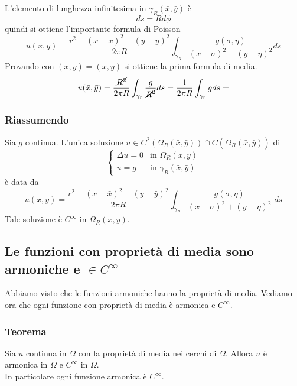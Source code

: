 L'elemento di lunghezza infinitesima in $\gamma_R (\bar{x}, \bar{y})$ \`e
\[
	ds= Rd\phi
\]
quindi si ottiene l'importante formula di Poisson
\[
	u(x,y)= \frac{r^2 - (x - \bar{x})^2 - (y -\bar{y})^2}{2 \pi R}
	\int_{\gamma_R} \frac{g(\sigma, \eta)}{(x - \sigma)^2+(y - \eta)^2} ds
\]
Provando con $(x,y)=(\bar{x},\bar{y})$ si ottiene la prima formula di media.
\[
	u (\bar{x},\bar{y}) = \frac{\cancel{R^2}}{2\pi R}
	\int_{\gamma_r} \frac{g}{\cancel{R^2}} ds=
	\frac{1}{2\pi R}
	\int_{\gamma_r} g ds=
\]
\subsubsection{Riassumendo}
Sia $g$ continua. L'unica soluzione 
$u \in C^2 (\Omega_R (\bar{x}, \bar{y})) \cap C( \bar{ \Omega}_R (\bar{x}, \bar{y}))$ di
\[
	\left\{
	\begin{array}{ll}
		\Delta u=0 	& \text{in } \Omega_R(\bar{x}, \bar{y}) \\
		u=g 		& \text{in } \gamma_R(\bar{x}, \bar{y})
	\end{array}
	\right.
\]
\`e data da
\[
	u(x,y)= \frac{r^2 - (x - \bar{x})^2 - (y -\bar{y})^2}{2 \pi R}
	\int_{\gamma_R} \frac{g(\sigma, \eta)}{(x - \sigma)^2+(y - \eta)^2} \; ds
\]
Tale soluzione \`e $C^{\infty}$ in $\Omega_R(\bar{x}, \bar{y})$.

\subsection{\texorpdfstring
{Le funzioni con propriet\`a di media sono armoniche e $\in C^{\infty}$}
{Le funzioni con propriet\`a di media sono armoniche e C inf}}
Abbiamo visto che le funzioni armoniche hanno la propriet\`a di media.
Vediamo ora che ogni funzione con propriet\`a di media \`e armonica e
$C^{\infty}$.
\subsubsection{Teorema}
Sia $u$ continua in $\Omega$ con la propriet\`a di media nei cerchi di
$\Omega$. Allora $u$ \`e armonica in $\Omega$ e $C^{\infty}$ in $\Omega$.\\
In particolare ogni funzione armonica \`e $C^{\infty}$.
